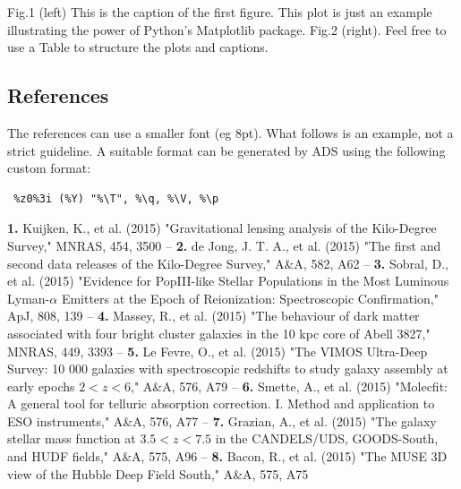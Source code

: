 \documentclass{article}
\begin{document}
Fig.1 (left) This is the caption of the first figure. This plot is just an example illustrating the power of Python’s Matplotlib package. Fig.2 (right). Feel free to use a Table to structure the plots and captions.

\subsection{References}

The references can use a smaller font (eg 8pt). What follows is an example, not a strict guideline. A suitable format can be generated by ADS using the following custom format: 
\begin{verbatim} %z0%3i (%Y) "%\T", %\q, %\V, %\p 
\end{verbatim}

{\footnotesize
{\bf 1.} Kuijken, K., et al. (2015) "Gravitational lensing analysis of the Kilo-Degree Survey," MNRAS,  454,  3500  -- 
{\bf 2.} de Jong, J. T. A., et al. (2015) "The first and second data releases of the Kilo-Degree Survey," A\&A,  582,  A62 -- 
{\bf 3.} Sobral, D., et al. (2015) "Evidence for PopIII-like Stellar Populations in the Most Luminous Lyman-$\alpha$ Emitters at the Epoch of Reionization: Spectroscopic Confirmation," ApJ,  808,  139 -- 
{\bf 4.} Massey, R., et al. (2015) "The behaviour of dark matter associated with four bright cluster galaxies in the 10 kpc core of Abell 3827," MNRAS,  449,  3393 -- 
{\bf 5.} Le Fevre, O., et al. (2015) "The VIMOS Ultra-Deep Survey: 10 000 galaxies with spectroscopic redshifts to study galaxy assembly at early epochs $2 < z < 6$," A\&A,  576,  A79 -- 
{\bf 6.} Smette, A., et al. (2015) "Molecfit: A general tool for telluric absorption correction. I. Method and application to ESO instruments," A\&A,  576,  A77 -- 
{\bf 7.} Grazian, A., et al. (2015) "The galaxy stellar mass function at $3.5 < z < 7.5$ in the CANDELS/UDS, GOODS-South, and HUDF fields," A\&A,  575,  A96 -- 
{\bf 8.} Bacon, R., et al. (2015) "The MUSE 3D view of the Hubble Deep Field South," A\&A,  575,  A75 
}
\end{document}
